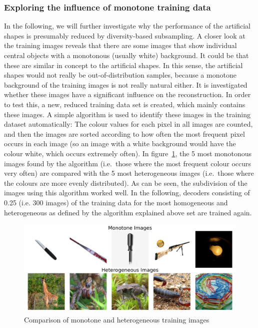 \subsubsection{Exploring the influence of monotone training data}
In the following, we will further investigate why the performance of the artificial shapes is presumably reduced by diversity-based subsampling. A closer look at the training images reveals that there are some images that show individual central objects with a monotonous (usually white) background. It could be that these are similar in concept to the artificial shapes. In this sense, the artificial shapes would not really be out-of-distribution samples, because a monotone background of the training images is not really natural either. It is investigated whether these images have a significant influence on the reconstruction. In order to test this, a new, reduced training data set is created, which mainly contains these images. A simple algorithm is used to identify these images in the training dataset automatically: The colour values for each pixel in all images are counted, and then the images are sorted according to how often the most frequent pixel occurs in each image (so an image with a white background would have the colour white, which occurs extremely often). In figure~\ref{fig:dropout_discussion_monohetero_qual}, the 5 most monotonous images found by the algorithm (i.e.\ those where the most frequent colour occurs very often) are compared with the 5 most heterogeneous images (i.e.\ those where the colours are more evenly distributed). As can be seen, the subdivision of the images using this algorithm worked well. In the following, decoders consisting of 0.25 (i.e. 300 images) of the training data for the most homogeneous and heterogeneous as defined by the algorithm explained above set are trained again.


\begin{figure}[ht]
  \centering
  \includegraphics[width=1\textwidth]{plots/dropout_discussion_monohetero_qual.jpeg}
  \caption{Comparison of monotone and heterogeneous training images}\label{fig:dropout_discussion_monohetero_qual}
\end{figure}

